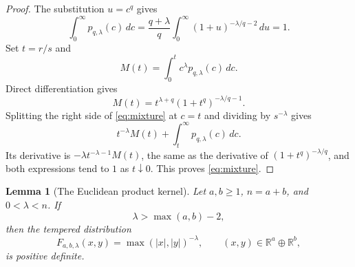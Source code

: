 \documentclass[11pt]{article}
\newtheorem{lemma}{Lemma}
\theoremstyle{remark}
\newcommand{\R}{\mathbb R}
\begin{document}
\begin{proof}
The substitution $u=c^q$ gives
\[
\int_0^\infty p_{q,\lambda}(c)\,dc
=\frac{q+\lambda}{q}\int_0^\infty
(1+u)^{-\lambda/q-2}\,du=1.
\]
Set $t=r/s$ and
\[
M(t)=\int_0^t c^\lambda p_{q,\lambda}(c)\,dc.
\]
Direct differentiation gives
\[
M(t)=t^{\lambda+q}(1+t^q)^{-\lambda/q-1}.
\]
Splitting the right side of \eqref{eq:mixture} at $c=t$ and dividing by
$s^{-\lambda}$ gives
\[
t^{-\lambda}M(t)+\int_t^\infty p_{q,\lambda}(c)\,dc.
\]
Its derivative is $-\lambda t^{-\lambda-1}M(t)$, the same as the
derivative of $(1+t^q)^{-\lambda/q}$, and both expressions tend to $1$ as
$t\downarrow0$.  This proves \eqref{eq:mixture}.
\end{proof}

\begin{lemma}[The Euclidean product kernel]\label{lem:product}
Let $a,b\geq1$, $n=a+b$, and $0<\lambda<n$.  If
\begin{equation}\label{eq:strict-range}
\lambda>\max(a,b)-2,
\end{equation}
then the tempered distribution
\[
F_{a,b,\lambda}(x,y)=\max(|x|,|y|)^{-\lambda},
\qquad (x,y)\in\R^a\oplus\R^b,
\]
is positive definite.
\end{lemma}
\end{document}
